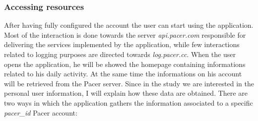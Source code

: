 		\subsubsection{Accessing resources}
			\par After having fully configured the account the user can start using the application. Most of the interaction is done towards the server \textit{api.pacer.com} responsible for delivering the services implemented by the application, while few interactions related to logging purposes are directed towards \textit{log.pacer.cc}. \newline
			When the user opens the application, he will be showed the homepage containing informations related to his daily activity. At the same time the informations on his account will be retrieved from the Pacer server. Since in the study we are interested in the personal user information, I will explain how these data are obtained. \newline
			There are two ways in which the application gathers the information associated to a specific \textit{pacer\_id} Pacer account:
